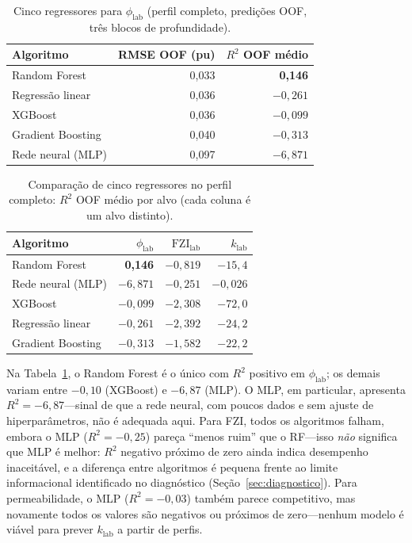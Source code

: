 \documentclass[11pt,a4paper]{article}
\newcommand{\philab}{\ensuremath{\phi_{\mathrm{lab}}}}
\newcommand{\fzilab}{\ensuremath{\mathrm{FZI}_{\mathrm{lab}}}}
\begin{document}
\begin{table}[H]
  \centering
  \caption{Cinco regressores para \philab{} (perfil completo,
           predições OOF, três blocos de profundidade).}
  \label{tab:regressors_phi}
  \begin{tabular}{lrr}
    \toprule
    Algoritmo & RMSE OOF (pu) & $R^2$ OOF médio \\
    \midrule
    Random Forest & 0,033 & \textbf{0,146} \\
    Regressão linear & 0,036 & $-0{,}261$ \\
    XGBoost & 0,036 & $-0{,}099$ \\
    Gradient Boosting & 0,040 & $-0{,}313$ \\
    Rede neural (MLP) & 0,097 & $-6{,}871$ \\
    \bottomrule
  \end{tabular}
\end{table}

\begin{table}[H]
  \centering
  \caption{Comparação de cinco regressores no perfil completo:
           $R^2$ OOF médio por alvo (cada coluna é um alvo distinto).}
  \label{tab:regressors}
  \small
  \begin{tabular}{lrrr}
    \toprule
    Algoritmo & \philab{} & \fzilab{} & $k_{\mathrm{lab}}$ \\
    \midrule
    Random Forest & \textbf{0,146} & $-0{,}819$ & $-15{,}4$ \\
    Rede neural (MLP) & $-6{,}871$ & $-0{,}251$ & $-0{,}026$ \\
    XGBoost & $-0{,}099$ & $-2{,}308$ & $-72{,}0$ \\
    Regressão linear & $-0{,}261$ & $-2{,}392$ & $-24{,}2$ \\
    Gradient Boosting & $-0{,}313$ & $-1{,}582$ & $-22{,}2$ \\
    \bottomrule
  \end{tabular}
\end{table}

Na Tabela~\ref{tab:regressors_phi}, o Random Forest é o único com $R^2$
positivo em \philab{}; os demais variam entre $-0{,}10$ (XGBoost) e
$-6{,}87$ (MLP).
O MLP, em particular, apresenta $R^2 = -6{,}87$---sinal de que a rede neural,
com poucos dados e sem ajuste de hiperparâmetros, não é adequada aqui.
Para FZI, todos os algoritmos falham, embora o MLP ($R^2 = -0{,}25$) pareça
``menos ruim'' que o RF---isso \emph{não} significa que MLP é melhor:
$R^2$ negativo próximo de zero ainda indica desempenho inaceitável, e a
diferença entre algoritmos é pequena frente ao limite informacional
identificado no diagnóstico (Seção~\ref{sec:diagnostico}).
Para permeabilidade, o MLP ($R^2 = -0{,}03$) também parece competitivo, mas
novamente todos os valores são negativos ou próximos de zero---nenhum
modelo é viável para prever $k_{\mathrm{lab}}$ a partir de perfis.
\end{document}
